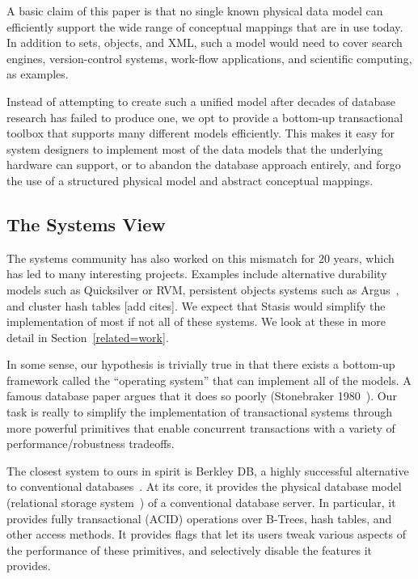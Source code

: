 \documentclass[letterpaper,twocolumn,10pt]{article}
\newcommand{\yad}{Stasis\xspace}
\begin{document}
A basic claim of
this paper is that no single known physical data model can efficiently
support the wide range of conceptual mappings that are in use today.
In addition to sets, objects, and XML, such a model would need
to cover search engines, version-control systems, work-flow
applications, and scientific computing, as examples.

Instead of attempting to create such a unified model after decades of
database research has failed to produce one, we opt to provide a
bottom-up transactional toolbox that supports many different models
efficiently.  This makes it easy for system designers to
implement most of the data models that the underlying hardware can
support, or to abandon the database approach entirely, and forgo the
use of a structured physical model and abstract conceptual mappings.

\subsection{The Systems View}

The systems community has also worked on this mismatch for 20 years,
which has led to many interesting projects.  Examples include
alternative durability models such as Quicksilver or RVM, persistent
objects systems such as Argus~\cite{argus}, and cluster hash tables [add cites].
We expect that \yad would simplify the implementation of most if not
all of these systems.  We look at these in more detail in
Section~\ref{related=work}.

In some sense, our hypothesis is trivially true in that there exists a
bottom-up framework called the ``operating system'' that can implement
all of the models. A famous database paper argues that it does so
poorly (Stonebraker 1980~\cite{Stonebraker80}). Our task is really to
simplify the implementation of transactional systems through more
powerful primitives that enable concurrent transactions with a variety
of performance/robustness tradeoffs.

The closest system to ours in spirit is Berkley DB,  a highly successful alternative to conventional
databases~\cite{libtp}.  At its core, it provides the physical database model
(relational storage system~\cite{systemR}) of a conventional database server.
In particular, 
it provides fully transactional (ACID) operations over B-Trees, 
hash tables, and other access methods.  It provides flags that 
let its users tweak various aspects of the performance of these
primitives, and selectively disable the features it provides.
\end{document}
